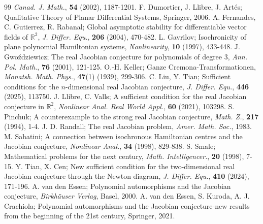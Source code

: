 \documentclass[10pt,a4paper]{amsart}
\numberwithin{equation}{section}
\begin{document}
\begin{thebibliography}{99}
\emph{Canad. J. Math.}, \textbf{54} (2002), 1187-1201.
 F. Dumortier, J. Llibre, J. Art\'{e}s;
Qualitative Theory of Planar Differential Systems, Springer, 2006.
 A. Fernandes, C. Gutierrez, R. Rabanal;
Global asymptotic stability for differentiable vector fields of $\mathbb{R}^2$,
\emph{J. Differ. Equ.}, \textbf{206} (2004), 470-482.
 L. Gavrilov;
Isochronicity of plane polynomial Hamiltonian systems,
\emph{Nonlinearity}, \textbf{10} (1997), 433-448.
 J. Gwo\'{z}dziewicz;
The real Jacobian conjecture for polynomials of degree 3,
\emph{Ann. Pol. Math.}, \textbf{76} (2001), 121-125.
 O.-H. Keller;
Ganze Cremona-Transformationen,
\emph{Monatsh. Math. Phys.}, \textbf{47}(1) (1939), 299-306.
 C. Liu, Y. Tian;
Sufficient conditions for the $n$-dimensional real Jacobian conjecture,
\emph{J. Differ. Equ.}, \textbf{446} (2025), 113750.
 J. Llibre, C. Valls;
A sufficient condition for the real Jacobian conjecture in $\mathbb{R}^2$,
\emph{Nonlinear Anal. Real World Appl.}, \textbf{60} (2021), 103298.
 S. Pinchuk;
A counterexample to the strong real Jacobian conjecture,
\emph{Math. Z.}, \textbf{217} (1994), 1-4.
 J. D. Randall;
The real Jacobian problem,
\emph{Amer. Math. Soc.}, 1983.
 M. Sabatini;
A connection between isochronous Hamiltonian centres and the Jacobian conjecture,
\emph{Nonlinear Anal.}, \textbf{34} (1998), 829-838.
 S. Smale;
Mathematical problems for the next century,
\emph{Math. Intelligencer.}, \textbf{20} (1998), 7-15.
 Y. Tian, X. Cen;
New sufficient condition for the two-dimensional real Jacobian conjecture 
through the Newton diagram,
\emph{J. Differ. Equ.}, \textbf{410} (2024), 171-196.
 A. van den Essen;
Polynomial automorphisms and the Jacobian conjecture,
\emph{Birkh\"{a}user Verlag}, Basel, 2000.
 A. van den Essen, S. Kuroda, A. J. Crachiola;
Polynomial automorphisms and the Jacobian conjecture-new results from the beginning 
of the 21st century, Springer, 2021.
\end{thebibliography}
\end{document}
